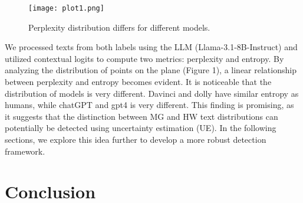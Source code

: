 \documentclass[a4paper, 12pt]{article}
\begin{document}
\begin{figure}[bhtp]
	\texttt{[image: plot1.png]}
	\caption{Perplexity distribution differs for different models.}
	\label{fig:schema}
\end{figure}

We processed texts from both labels using the LLM (Llama-3.1-8B-Instruct) and utilized contextual logits to compute two metrics: perplexity and entropy. By analyzing the distribution of points on the plane (Figure 1), a linear relationship between perplexity and entropy becomes evident. It is noticeable that the distribution of models is very different. Davinci and dolly have similar entropy as humans, while chatGPT and gpt4 is very different. This finding is promising, as it suggests that the distinction between MG and HW text distributions can potentially be detected using uncertainty estimation (UE). In the following sections, we explore this idea further to develop a more robust detection framework. 

\section{Conclusion}



\end{document}
